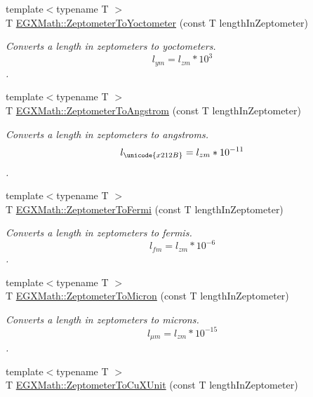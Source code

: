 \begin{DoxyCompactItemize}
{\footnotesize template$<$typename T $>$ }\\T \mbox{\hyperlink{group___e_g_x_math-_conversions-_length_conversions-_s_i-_zeptometer-_s_i_ga0477d1a8cb246721ce00cfd7b73d5c9e}{E\+G\+X\+Math\+::\+Zeptometer\+To\+Yoctometer}} (const T length\+In\+Zeptometer)
\begin{DoxyCompactList}\small\item\em Converts a length in zeptometers to yoctometers. \[ l_{ym}=l_{zm} * 10^{3} \]. \end{DoxyCompactList}\item 
{\footnotesize template$<$typename T $>$ }\\T \mbox{\hyperlink{group___e_g_x_math-_conversions-_length_conversions-_s_i-_zeptometer-_non-_s_i_gaa7023afd2a269dddf741cb4299803ef2}{E\+G\+X\+Math\+::\+Zeptometer\+To\+Angstrom}} (const T length\+In\+Zeptometer)
\begin{DoxyCompactList}\small\item\em Converts a length in zeptometers to angstroms. \[ l_{\unicode{x212B}}=l_{zm} * 10^{-11} \]. \end{DoxyCompactList}\item 
{\footnotesize template$<$typename T $>$ }\\T \mbox{\hyperlink{group___e_g_x_math-_conversions-_length_conversions-_s_i-_zeptometer-_non-_s_i_ga15c5cde158a9916cc01d998c7abc38c4}{E\+G\+X\+Math\+::\+Zeptometer\+To\+Fermi}} (const T length\+In\+Zeptometer)
\begin{DoxyCompactList}\small\item\em Converts a length in zeptometers to fermis. \[ l_{fm}=l_{zm} * 10^{-6} \]. \end{DoxyCompactList}\item 
{\footnotesize template$<$typename T $>$ }\\T \mbox{\hyperlink{group___e_g_x_math-_conversions-_length_conversions-_s_i-_zeptometer-_non-_s_i_ga0bd42e8489b135f27530a247193286da}{E\+G\+X\+Math\+::\+Zeptometer\+To\+Micron}} (const T length\+In\+Zeptometer)
\begin{DoxyCompactList}\small\item\em Converts a length in zeptometers to microns. \[ l_{\mu m}=l_{zm} * 10^{-15} \]. \end{DoxyCompactList}\item 
{\footnotesize template$<$typename T $>$ }\\T \mbox{\hyperlink{group___e_g_x_math-_conversions-_length_conversions-_s_i-_zeptometer-_non-_s_i_gaeeff3d1ea7d8cd0c703419ce16fcadd7}{E\+G\+X\+Math\+::\+Zeptometer\+To\+Cu\+X\+Unit}} (const T length\+In\+Zeptometer)

\end{DoxyCompactItemize}
